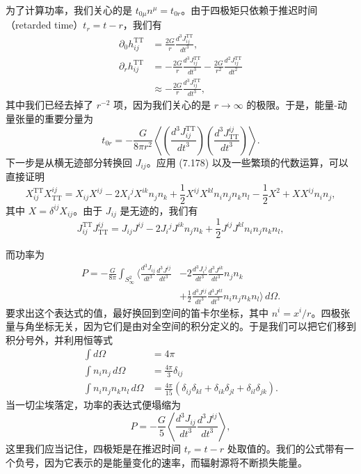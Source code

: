为了计算功率，我们关心的是 $t_{0\mu}n^\mu = t_{0r}$。由于四极矩只依赖于推迟时间（retarded time）$t_r = t - r$，我们有
\begin{align*}
\partial_0 h^{\mathrm{TT}}_{ij} &= \frac{2G}{r}\frac{d^3 J^{\mathrm{TT}}_{ij}}{dt^3},\\
\partial_r h^{\mathrm{TT}}_{ij} &= -\frac{2G}{r}\frac{d^3 J^{\mathrm{TT}}_{ij}}{dt^3} - \frac{2G}{r^2}\frac{d^2 J^{\mathrm{TT}}_{ij}}{dt^2}\\
&\approx -\frac{2G}{r}\frac{d^3 J^{\mathrm{TT}}_{ij}}{dt^3},
\tag{7.183}
\end{align*}
其中我们已经去掉了 $r^{-2}$ 项，因为我们关心的是 $r \to \infty$ 的极限。于是，能量-动量张量的重要分量为
\begin{equation*}
t_{0r} = -\frac{G}{8\pi r^2}\left\langle\left(\frac{d^3 J^{\mathrm{TT}}_{ij}}{dt^3}\right)\left(\frac{d^3 J_{\mathrm{TT}}^{ij}}{dt^3}\right)\right\rangle.
\tag{7.184}
\end{equation*}
下一步是从横无迹部分转换回 $J_{ij}$。应用 (7.178) 以及一些繁琐的代数运算，可以直接证明
\begin{equation*}
X^{\mathrm{TT}}_{ij}X_{\mathrm{TT}}^{ij} = X_{ij}X^{ij} - 2X_i{}^j X^{ik}n_j n_k + \frac{1}{2}X^{ij}X^{kl}n_i n_j n_k n_l - \frac{1}{2}X^2 + XX^{ij}n_i n_j,
\tag{7.185}
\end{equation*}
其中 $X = \delta^{ij}X_{ij}$。由于 $J_{ij}$ 是无迹的，我们有
\begin{equation*}
J^{\mathrm{TT}}_{ij}J_{\mathrm{TT}}^{ij} = J_{ij}J^{ij} - 2J_i{}^j J^{ik}n_j n_k + \frac{1}{2}J^{ij}J^{kl}n_i n_j n_k n_l,
\tag{7.186}
\end{equation*}


而功率为
\begin{align*}
P = -\frac{G}{8\pi}\int_{S^2_\infty}\bigg\langle \frac{d^3 J_{ij}}{dt^3}\frac{d^3 J^{ij}}{dt^3} &- 2\frac{d^3 J_i{}^j}{dt^3}\frac{d^3 J^{ik}}{dt^3}n_j n_k\\
&+ \frac{1}{2}\frac{d^3 J^{ij}}{dt^3}\frac{d^3 J^{kl}}{dt^3}n_i n_j n_k n_l\bigg\rangle\, d\Omega.
\tag{7.187}
\end{align*}
要求出这个表达式的值，最好换回到空间的笛卡尔坐标，其中 $n^i = x^i/r$。四极张量与角坐标无关，因为它们是由对全空间的积分定义的。于是我们可以把它们移到积分号外，并利用恒等式
\begin{align*}
\int d\Omega &= 4\pi\\
\int n_i n_j\, d\Omega &= \frac{4\pi}{3}\delta_{ij}\\
\int n_i n_j n_k n_l\, d\Omega &= \frac{4\pi}{15}\left(\delta_{ij}\delta_{kl} + \delta_{ik}\delta_{jl} + \delta_{il}\delta_{jk}\right).
\tag{7.188}
\end{align*}
当一切尘埃落定，功率的表达式便塌缩为
\begin{equation*}
P = -\frac{G}{5}\left\langle \frac{d^3 J_{ij}}{dt^3}\frac{d^3 J^{ij}}{dt^3}\right\rangle,
\tag{7.189}
\end{equation*}
这里我们应当记住，四极矩是在推迟时间 $t_r = t - r$ 处取值的。我们的公式带有一个负号，因为它表示的是能量变化的速率，而辐射源将不断损失能量。

